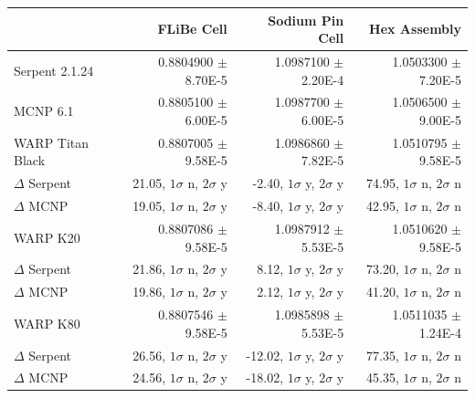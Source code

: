 \documentclass[preprint,12pt]{elsarticle}
\begin{document}
\begin{table}[h]
\smallskip

\begin{tabular}{| l | r | r | r |}
\cline{2-4}
\multicolumn{1}{c|}{}               & FLiBe Cell                      & Sodium Pin Cell                  & Hex Assembly                      \\
\hline                       
Serpent 2.1.24                      & 0.8804900 $\pm$ 8.70E-5         & 1.0987100 $\pm$ 2.20E-4          & 1.0503300 $\pm$ 7.20E-5           \\
\hline                       
MCNP 6.1                            & 0.8805100 $\pm$ 6.00E-5         & 1.0987700 $\pm$ 6.00E-5          & 1.0506500 $\pm$ 9.00E-5           \\
\hline                       
WARP Titan Black                    & 0.8807005 $\pm$ 9.58E-5         & 1.0986860 $\pm$ 7.82E-5          & 1.0510795 $\pm$ 9.58E-5           \\
    \qquad\qquad   $\Delta$ Serpent & 21.05, $1\sigma$ n, $2\sigma$ y & -2.40, $1\sigma$ y, $2\sigma$ y  &  74.95, $1\sigma$ n, $2\sigma$ n  \\
    \qquad\qquad   $\Delta$ MCNP    & 19.05, $1\sigma$ n, $2\sigma$ y & -8.40, $1\sigma$ y, $2\sigma$ y  &  42.95, $1\sigma$ n, $2\sigma$ n  \\
\hline
WARP K20                            & 0.8807086 $\pm$ 9.58E-5         & 1.0987912 $\pm$ 5.53E-5          & 1.0510620 $\pm$ 9.58E-5           \\
    \qquad\qquad   $\Delta$ Serpent & 21.86, $1\sigma$ n, $2\sigma$ y & 8.12, $1\sigma$ y, $2\sigma$ y   &  73.20, $1\sigma$ n, $2\sigma$ n  \\
    \qquad\qquad   $\Delta$ MCNP    & 19.86, $1\sigma$ n, $2\sigma$ y & 2.12, $1\sigma$ y, $2\sigma$ y   &  41.20, $1\sigma$ n, $2\sigma$ n  \\
\hline
WARP K80                            & 0.8807546 $\pm$ 9.58E-5         & 1.0985898 $\pm$ 5.53E-5          & 1.0511035 $\pm$ 1.24E-4          \\
    \qquad\qquad   $\Delta$ Serpent & 26.56, $1\sigma$ n, $2\sigma$ y & -12.02, $1\sigma$ y, $2\sigma$ y &  77.35, $1\sigma$ n, $2\sigma$ n  \\
    \qquad\qquad   $\Delta$ MCNP    & 24.56, $1\sigma$ n, $2\sigma$ y & -18.02, $1\sigma$ y, $2\sigma$ y &  45.35, $1\sigma$ n, $2\sigma$ n  \\
\hline
\end{tabular}
\end{table}
\end{document}
